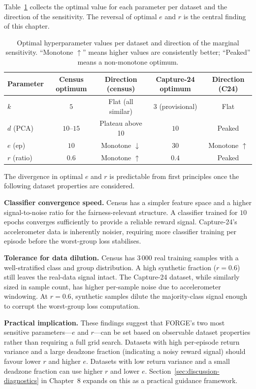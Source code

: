\documentclass[12pt]{article}
\begin{document}
Table~\ref{tab:param-summary} collects the optimal value for each parameter
per dataset and the direction of the sensitivity.
The reversal of optimal $e$ and $r$ is the central finding of this chapter.

\begin{table}[h]
\centering
\caption{Optimal hyperparameter values per dataset and direction of the
marginal sensitivity. ``Monotone $\uparrow$'' means higher values are
consistently better; ``Peaked'' means a non-monotone optimum.}
\label{tab:param-summary}
\renewcommand{\arraystretch}{1.3}
\begin{tabular}{lcccc}
\toprule
Parameter & Census optimum & Direction (census) & Capture-24 optimum & Direction (C24) \\
\midrule
$k$       & $5$      & Flat (all similar)    & $3$ (provisional) & Flat \\
$d$ (PCA) & $10$--$15$ & Plateau above 10    & $10$              & Peaked \\
$e$ (ep)  & $10$     & Monotone $\downarrow$ & $30$              & Monotone $\uparrow$ \\
$r$ (ratio) & $0.6$  & Monotone $\uparrow$   & $0.4$             & Peaked \\
\bottomrule
\end{tabular}
\end{table}

The divergence in optimal $e$ and $r$ is predictable from first principles
once the following dataset properties are considered.

\textbf{Classifier convergence speed.} Census has a simpler feature space and
a higher signal-to-noise ratio for the fairness-relevant structure.
A classifier trained for $10$ epochs converges sufficiently to provide
a reliable reward signal.
Capture-24's accelerometer data is inherently noisier, requiring more
classifier training per episode before the worst-group loss stabilises.

\textbf{Tolerance for data dilution.} Census has $3\,000$ real training
samples with a well-stratified class and group distribution.
A high synthetic fraction ($r = 0.6$) still leaves the real-data signal
intact.
The Capture-24 dataset, while similarly sized in sample count, has higher
per-sample noise due to accelerometer windowing.
At $r = 0.6$, synthetic samples dilute the majority-class signal enough
to corrupt the worst-group loss computation.

\textbf{Practical implication.} These findings suggest that FORGE's
two most sensitive parameters---$e$ and $r$---can be set based on observable
dataset properties rather than requiring a full grid search.
Datasets with high per-episode return variance and a large deadzone fraction
(indicating a noisy reward signal) should favour lower $r$ and higher $e$.
Datasets with low return variance and a small deadzone fraction can use
higher $r$ and lower $e$.
Section~\ref{sec:discussion-diagnostics} in Chapter~8 expands on this
as a practical guidance framework.
\end{document}
